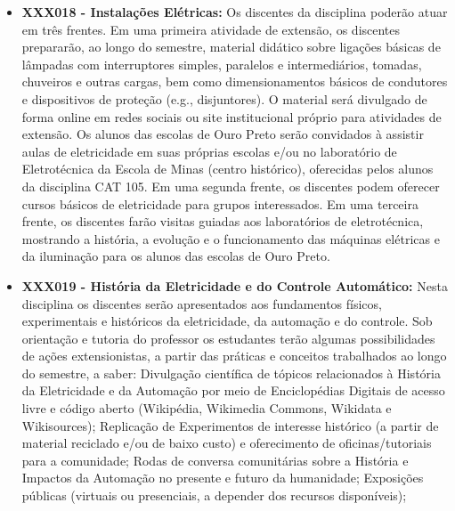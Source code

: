 \documentclass[
	12pt,				%
	openright,			%
	oneside,			%
	a4paper,			%
	english,			%
	brazil				%
	]{abntex2}
\begin{document}
\begin{itemize}
     \item \textbf{XXX018 - Instalações Elétricas:} Os discentes da disciplina poderão atuar em três frentes. Em uma primeira atividade de extensão, os discentes prepararão, ao longo do semestre, material didático sobre ligações básicas de lâmpadas com interruptores simples, paralelos e intermediários, tomadas, chuveiros e outras cargas, bem como dimensionamentos básicos de condutores e dispositivos de proteção (e.g., disjuntores). O material será divulgado de forma online em redes sociais ou site institucional próprio para atividades de extensão. Os alunos das escolas de Ouro Preto serão convidados à assistir aulas de eletricidade em suas próprias escolas e/ou no laboratório de Eletrotécnica da Escola de Minas (centro histórico), oferecidas pelos alunos da disciplina CAT 105. Em uma segunda frente, os discentes podem oferecer cursos básicos de eletricidade para grupos interessados. Em uma terceira frente, os discentes farão visitas guiadas aos laboratórios de eletrotécnica, mostrando a história, a evolução e o funcionamento das máquinas elétricas e da iluminação para os alunos das escolas de Ouro Preto.

    \item \textbf{XXX019 - História da Eletricidade e do Controle Automático:} Nesta disciplina os discentes serão apresentados aos fundamentos físicos, experimentais e históricos da eletricidade, da automação e do controle. Sob orientação e tutoria do professor os estudantes terão algumas possibilidades de ações extensionistas, a partir das práticas e conceitos trabalhados ao longo do semestre, a saber: Divulgação científica de tópicos relacionados à História da Eletricidade e da Automação por meio de Enciclopédias Digitais de acesso livre e código aberto (Wikipédia, Wikimedia Commons, Wikidata e Wikisources); Replicação de Experimentos de interesse histórico (a partir de material reciclado e/ou de baixo custo) e oferecimento de oficinas/tutoriais para a comunidade; Rodas de conversa comunitárias sobre a História e Impactos da Automação no presente e futuro da humanidade; Exposições públicas (virtuais ou presenciais, a depender dos recursos disponíveis);


\end{itemize}
\end{document}
